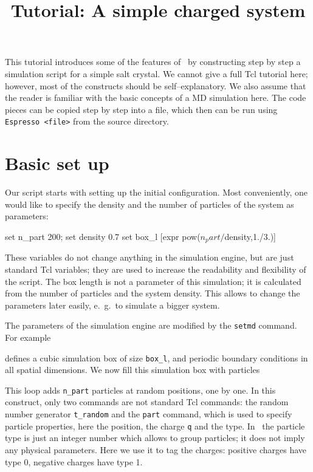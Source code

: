 \documentclass[
a4paper,                        %
11pt,                           %
twoside,                        %
footsepline,                    %
headsepline,                    %
headexclude,                    %
footexclude,                    %
pagesize,                       %
]{scrreprt}
\begin{document}
\esptitlehead
\title{Tutorial: A simple charged system}
\maketitle
\tableofcontents

This tutorial introduces some of the features of \es\ by constructing
step by step a simulation script for a simple salt crystal.  We cannot
give a full Tcl tutorial here; however, most of the constructs should
be self--explanatory. We also assume that the reader is familiar with
the basic concepts of a MD simulation here. The code pieces can be
copied step by step into a file, which then can be run using
\verb|Espresso <file>| from the \es source directory.

\section{Basic set up}

Our script starts with setting up the initial configuration.  Most
conveniently, one would like to specify the density and the number of
particles of the system as parameters:
\begin{tclcode}
  set n_part 200; set density 0.7 set box_l [expr
  pow($n_part/$density,1./3.)]
\end{tclcode}
These variables do not change anything in the simulation engine, but
are just standard Tcl variables; they are used to increase the
readability and flexibility of the script. The box length is not a
parameter of this simulation; it is calculated from the number of
particles and the system density. This allows to change the parameters
later easily, e.~g.\ to simulate a bigger system.

The parameters of the simulation engine are modified by the
\verb|setmd| command. For example
defines a cubic simulation box of size \verb|box_l|, and periodic
boundary conditions in all spatial dimensions. We now fill this
simulation box with particles
This loop adds \verb|n_part| particles at random positions, one by
one.  In this construct, only two commands are not standard Tcl
commands: the random number generator \verb|t_random| and the
\verb|part| command, which is used to specify particle properties,
here the position, the charge \verb|q| and the type. In \es\ the
particle type is just an integer number which allows to group
particles; it does not imply any physical parameters. Here we use it
to tag the charges: positive charges have type 0, negative charges
have type 1.
\end{document}
